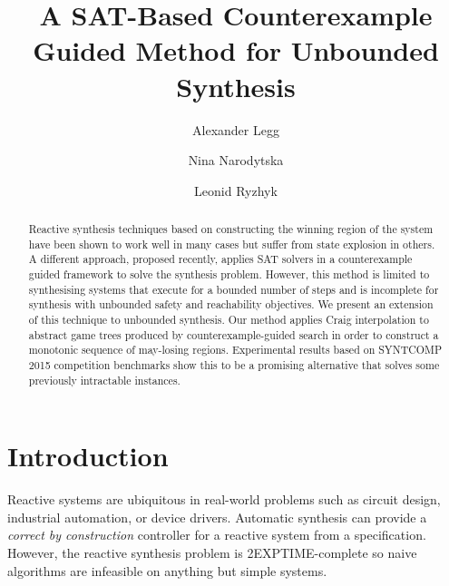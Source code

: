 \documentclass{llncs}
\begin{document}
\title{A SAT-Based Counterexample Guided Method for Unbounded Synthesis}

\author{Alexander Legg 
    \and Nina Narodytska
    \and Leonid Ryzhyk}


\maketitle

\begin{abstract}

    Reactive synthesis techniques based on constructing the winning region of
    the system have been shown to work well in many cases but suffer from state
    explosion in others.  A different approach, proposed recently, applies SAT
    solvers in a counterexample guided framework to solve the synthesis
    problem.  However, this method is limited to synthesising systems that
    execute for a bounded number of steps and is incomplete for synthesis with
    unbounded safety and reachability objectives.  We present an extension of
    this technique to unbounded synthesis.  Our method applies Craig
    interpolation to abstract game trees produced by counterexample-guided
    search in order to construct a monotonic sequence of may-losing regions.
    Experimental results based on SYNTCOMP 2015 competition benchmarks show
    this to be a promising alternative that solves some previously intractable
    instances.

\end{abstract}

\section{Introduction}

Reactive systems are ubiquitous in real-world problems such as circuit design,
industrial automation, or device drivers. Automatic synthesis can provide a
\emph{correct by construction} controller for a reactive system from a
specification.  However, the reactive synthesis problem is 2EXPTIME-complete so
naive algorithms are infeasible on anything but simple systems.
\end{document}
